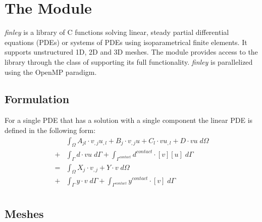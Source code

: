
%
%
%

\chapter{The \finley Module}\label{CHAPTER ON FINLEY}

{\it finley} is a library of C functions solving linear, steady partial
differential equations (PDEs) or systems
of PDEs using isoparametrical finite elements.
It supports unstructured 1D, 2D and 3D meshes.
The module \finley provides access to the library through the \LinearPDE class
of \escript supporting its full functionality.
{\it finley} is parallelized using the OpenMP paradigm.

\section{Formulation}
For a single PDE that has a solution with a single component the linear PDE is
defined in the following form:
\begin{equation}\label{FINLEY.SINGLE.1}
\begin{array}{cl} &
\displaystyle{
\int_{\Omega}
A_{jl} \cdot v_{,j}u_{,l}+ B_{j} \cdot v_{,j} u+ C_{l} \cdot v u_{,l}+D \cdot vu \; d\Omega }  \\
+ & \displaystyle{\int_{\Gamma} d \cdot vu \; d{\Gamma} }
+  \displaystyle{\int_{\Gamma^{contact}} d^{contact} \cdot [v][u] \; d{\Gamma} } \\
= & \displaystyle{\int_{\Omega}  X_{j} \cdot v_{,j}+ Y \cdot v \; d\Omega }\\
+ & \displaystyle{\int_{\Gamma} y \cdot v \; d{\Gamma}}  +
\displaystyle{\int_{\Gamma^{contact}} y^{contact}\cdot [v] \; d{\Gamma}} \\
\end{array}
\end{equation}

\section{Meshes}
\label{FINLEY MESHES}

